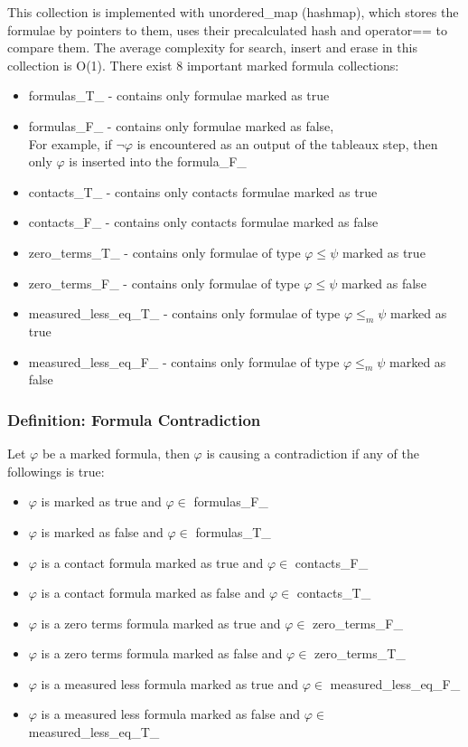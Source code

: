 \documentclass{article}
\begin{document}
			This collection is implemented with unordered\_map (hashmap),
			which stores the formulae by pointers to them, uses their precalculated hash and operator== to compare them.
			The average complexity for search, insert and erase in this collection is O(1).
		\newline
		\newline
		There exist 8 important marked formula collections:
		\begin{itemize}
			\item formulas\_T\_ - contains only formulae marked as true
			\item formulas\_F\_ - contains only formulae marked as false, \\
				For example, if $\neg\varphi$ is encountered as an output of the tableaux step, then only $\varphi$ is inserted into the formula\_F\_
			\item contacts\_T\_ - contains only contacts formulae marked as true
			\item contacts\_F\_ - contains only contacts formulae marked as false
			\item zero\_terms\_T\_ - contains only formulae of type $\varphi \le \psi$ marked as true
			\item zero\_terms\_F\_ - contains only formulae of type $\varphi \le \psi$ marked as false
			\item measured\_less\_eq\_T\_ - contains only formulae of type $\varphi \le_m \psi$ marked as true
			\item measured\_less\_eq\_F\_ - contains only formulae of type $\varphi \le_m \psi$ marked as false
		\end{itemize}

		\subsubsection*{Definition: Formula Contradiction}
			Let $\varphi$ be a marked formula, then $\varphi$ is causing a contradiction if any of the followings is true:
			\begin{itemize}
				\item $\varphi$ is marked as true and $\varphi \in$ formulas\_F\_
				\item $\varphi$ is marked as false and $\varphi \in$ formulas\_T\_
				\item $\varphi$ is a contact formula marked as true and $\varphi \in$ contacts\_F\_
				\item $\varphi$ is a contact formula marked as false and $\varphi \in$ contacts\_T\_
				\item $\varphi$ is a zero terms formula marked as true and $\varphi \in$ zero\_terms\_F\_
				\item $\varphi$ is a zero terms formula marked as false and $\varphi \in$ zero\_terms\_T\_
				\item $\varphi$ is a measured less formula marked as true and $\varphi \in$ measured\_less\_eq\_F\_
				\item $\varphi$ is a measured less formula marked as false and $\varphi \in$ measured\_less\_eq\_T\_

			\end{itemize}
\end{document}
